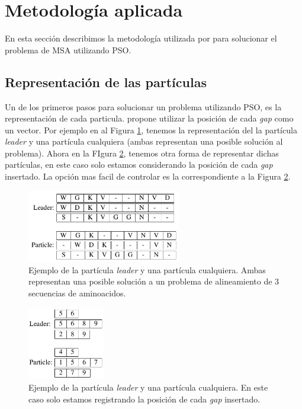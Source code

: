 \documentclass{cup-pan}
\begin{document}
	
	\section{Metodología aplicada}
	
	En esta sección describimos la metodología utilizada por \citet{zablocki2009multiple} para solucionar el problema de MSA utilizando PSO.
	
	\subsection{Representación de las partículas}
	
	Un de los primeros pasos para solucionar un problema utilizando PSO, es la representación de cada particula. \citet{zablocki2009multiple} propone utilizar la posición de cada \textit{gap} como un vector. Por ejemplo en al Figura \ref{fig:pso_1}, tenemos la representación del la partícula \textit{leader} y una partícula cualquiera (ambas representan una posible solución al problema). Ahora en la FIgura  \ref{fig:pso_2}, tenemos otra forma de representar dichas partículas, en este caso solo estamos considerando la posición de cada \textit{gap} insertado. La opción mas facil de controlar es la correspondiente a la Figura \ref{fig:pso_2}. \\
	
	\begin{figure}[h]
		\centering
		\includegraphics[width=0.6\textwidth]{images/pso_1}
		\caption{Ejemplo de la partícula \textit{leader} y una partícula cualquiera. Ambas representan una posible solución a un problema de alineamiento de 3 secuencias de aminoacidos.}
		\label{fig:pso_1}
	\end{figure}

	\begin{figure}[h]
		\centering
		\includegraphics[width=0.3\textwidth]{images/pso_2}
		\caption{Ejemplo de la partícula \textit{leader} y una partícula cualquiera. En este caso solo estamos registrando la posición de cada \textit{gap } insertado.}
		\label{fig:pso_2}
	\end{figure}
	
\end{document}

